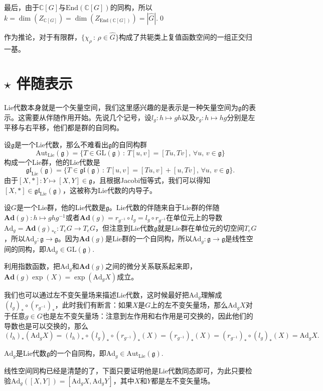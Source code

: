 \documentclass[9pt]{extarticle}
\newcommand{\cc}{\mathbb{C}}
\newcommand{\lag}{{\mathfrak{g}}}
\begin{document}
最后，由于$\cc [G]$与$\mathrm{End}(\cc [G])$的同构，所以$k=\dim (Z_{\cc [G]})=\dim (Z_{\mathrm{End}(\cc [G])})=|\hat{G}|$.\qed

\para 作为推论，对于有限群，$\{\chi_\rho\,:\, \rho\in \hat{G}\}$构成了共轭类上复值函数空间的一组正交归一基。

\section{$\star$ 伴随表示}

Lie代数本身就是一个矢量空间，我们这里感兴趣的是表示是一种矢量空间为$\lag$的表示。这需要从伴随作用开始。先说几个记号，设$l_g:h\mapsto gh$以及$r_g:h\mapsto hg$分别是左平移与右平移，他们都是群的自同构。

\para 设$\lag$是一个Lie代数，那么不难看出$\lag$的自同构群
\[\mathrm{Aut}_{\mathrm{Lie}}(\lag)=\{T\in \mathrm{GL}(\lag)\,:\,T[u,v]=[Tu,Tv],\,\forall u,\,v\in\lag\}\]
构成一个Lie群，他的Lie代数是
\[\mathfrak{gl}_{\mathrm{Lie}}(\lag)=\{T\in \mathfrak{gl}(\lag)\,:\,T[u,v]=[Tu,v]+[u,Tv],\,\forall u,\,v\in\lag\}.\]
由于$[X,*]:Y\mapsto [X,Y]\in \lag$，且根据Jacobi恒等式，我们可以得知$[X,*]\in \mathfrak{gl}_{\mathrm{Lie}}(\lag)$，这被称为Lie代数的内导子。

\para 设$G$是一个Lie群，他的Lie代数是$\lag$。Lie代数的伴随来自于Lie群的伴随$\mathbf{Ad}(g):h\mapsto ghg^{-1}$或者$\mathbf{Ad}(g)=r_{g^{-1}}\circ l_g=l_g\circ r_{g^{-1}}$在单位元上的导数$\mathrm{Ad}_g=\mathbf{Ad}(g)_{*e}:T_eG\to T_eG$，但注意到Lie代数$\lag$就是Lie群在单位元的切空间$T_eG$，所以$\mathrm{Ad}_g:\lag\to \lag$。因为$\mathbf{Ad}(g)$是Lie群的一个自同构，所以$\mathrm{Ad}_g:\lag\to\lag$是线性空间的同构，即$\mathrm{Ad}_g\in \mathrm{GL}(\lag)$.

利用指数函数，把$\mathrm{Ad}_g$和$\mathbf{Ad}(g)$之间的微分关系联系起来即，$\mathbf{Ad}(g)\exp(X)=\exp(\mathrm{Ad}_gX)$成立。

\para 我们也可以通过左不变矢量场来描述Lie代数，这时候最好把$\mathrm{Ad}_g$理解成$(l_g)_*\circ (r_{g^{-1}})_*$，此时我们有断言：如果$X$是$G$上的左不变矢量场，那么$\mathrm{Ad}_gX$对于任意$g\in G$也是左不变矢量场：注意到左作用和右作用是可交换的，因此他们的导数也是可以交换的，那么
\[
	(l_h)_*(\mathrm{Ad}_gX)=(l_h)_*\circ (l_g)_*\circ (r_{g^{-1}})_*(X)=(r_{g^{-1}})_*(X)=(r_{g^{-1}})_*\circ (l_g)_*(X)=\mathrm{Ad}_gX.
\]

\para $\mathrm{Ad}_g$是Lie代数$\lag$的一个自同构，即$\mathrm{Ad}_g\in \mathrm{Aut}_{\mathrm{Lie}}(\lag)$.

线性空间同构已经是清楚的了，下面只要证明他是Lie代数同态即可，为此只要检验$\mathrm{Ad}_g([X,Y])=[\mathrm{Ad}_gX,\mathrm{Ad}_gY]$，其中$X$和$Y$都是左不变矢量场。
\end{document}
